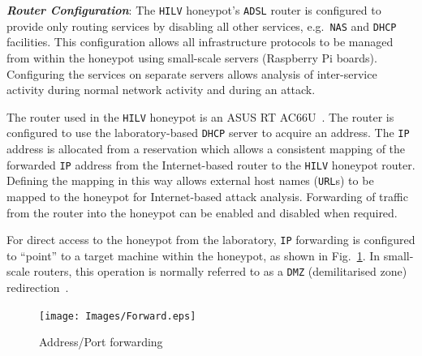 \documentclass[10pt,journal]{IEEEtran}
\begin{document}
\noindent\textit{\textbf{Router Configuration}}:
The \texttt{HILV} honeypot's \texttt{ADSL} router is configured to provide only
routing services by disabling all other services, e.g.\ \texttt{NAS} and
\texttt{DHCP} facilities. This configuration allows all infrastructure
protocols to be managed from within the honeypot using small-scale servers
(Raspberry Pi boards). Configuring the services on separate
servers allows analysis of inter-service activity during normal network
activity and during an attack.

The router used in the \texttt{HILV} honeypot is an ASUS RT
AC66U~\cite{ASUS:17}. The router is configured to use the laboratory-based
\texttt{DHCP} server to acquire an  address. The \texttt{IP} address is
allocated from a reservation which allows a consistent mapping of the forwarded
\texttt{IP} address from the Internet-based router to the \texttt{HILV} honeypot
router. Defining the mapping in this way allows external host names
(\texttt{URL}s) to be mapped to the honeypot for Internet-based attack
analysis. Forwarding of traffic from the router into the honeypot
can be enabled and disabled when required.

For direct access to the honeypot from the laboratory, \texttt{IP} forwarding is
configured to  ``point'' to a target machine within the honeypot,
as shown in Fig.~\ref{fig:Forward}. In small-scale routers, this operation is
normally referred to as a \texttt{DMZ} (demilitarised zone) redirection~\cite{MB:01}.
\newline
\begin{figure}[ht]
\begin{center}
	\texttt{[image: Images/Forward.eps]}
\caption{Address/Port forwarding}
\label{fig:Forward}
\end{center}
\end{figure}
\end{document}
